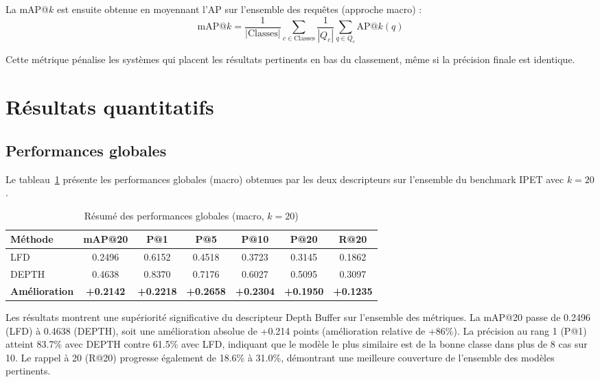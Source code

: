 \documentclass[11pt,a4paper,oneside]{report}
\begin{document}
La mAP@$k$ est ensuite obtenue en moyennant l'AP sur l'ensemble des requêtes (approche macro) :
$$\text{mAP@}k = \frac{1}{|\text{Classes}|} \sum_{c \in \text{Classes}} \frac{1}{|Q_c|} \sum_{q \in Q_c} \text{AP@}k(q)$$

Cette métrique pénalise les systèmes qui placent les résultats pertinents en bas du classement, même si la précision finale est identique.

\section{Résultats quantitatifs}

\subsection{Performances globales}

Le tableau~\ref{tab:global_results} présente les performances globales (macro) obtenues par les deux descripteurs sur l'ensemble du benchmark IPET avec $k = 20$.

\begin{table}[H]
\centering
\caption{Résumé des performances globales (macro, $k = 20$)}
\label{tab:global_results}
\begin{tabular}{lcccccc}
\toprule
\textbf{Méthode} & \textbf{mAP@20} & \textbf{P@1} & \textbf{P@5} & \textbf{P@10} & \textbf{P@20} & \textbf{R@20} \\
\midrule
LFD & 0.2496 & 0.6152 & 0.4518 & 0.3723 & 0.3145 & 0.1862 \\
DEPTH & 0.4638 & 0.8370 & 0.7176 & 0.6027 & 0.5095 & 0.3097 \\
\midrule
\textbf{Amélioration} & \textbf{+0.2142} & \textbf{+0.2218} & \textbf{+0.2658} & \textbf{+0.2304} & \textbf{+0.1950} & \textbf{+0.1235} \\
\bottomrule
\end{tabular}
\end{table}

Les résultats montrent une supériorité significative du descripteur Depth Buffer sur l'ensemble des métriques. La mAP@20 passe de 0.2496 (LFD) à 0.4638 (DEPTH), soit une amélioration absolue de +0.214 points (amélioration relative de +86\%). La précision au rang 1 (P@1) atteint 83.7\% avec DEPTH contre 61.5\% avec LFD, indiquant que le modèle le plus similaire est de la bonne classe dans plus de 8 cas sur 10. Le rappel à 20 (R@20) progresse également de 18.6\% à 31.0\%, démontrant une meilleure couverture de l'ensemble des modèles pertinents.
\end{document}
